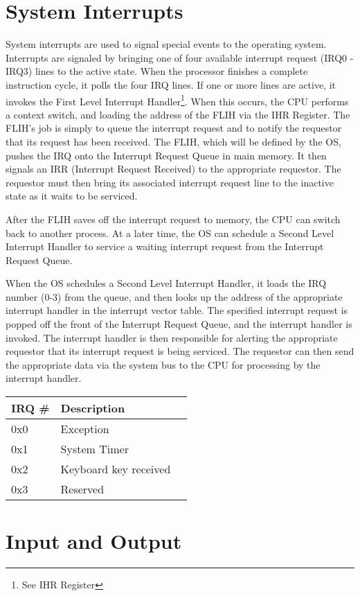 \documentclass{book}
\begin{document}
\section{System Interrupts}
System interrupts are used to signal special events to the operating system. Interrupts are signaled by
bringing one of four available interrupt request (IRQ0 - IRQ3) lines to the active state. When the processor
finishes a complete instruction cycle, it polls the four IRQ lines. If one or more lines are active, it invokes
the First Level Interrupt Handler\footnote{See IHR Register}. When this occurs, the CPU performs a context switch,
and loading the address of the FLIH via the IHR Register. The FLIH's job is simply to queue the interrupt request
and to notify the requestor that its request has been received. The FLIH, which will be defined by the OS,
pushes the IRQ onto the Interrupt Request Queue in main memory. It then signals an IRR (Interrupt Request
Received) to the appropriate requestor. The requestor must then bring its associated interrupt request line to
the inactive state as it waits to be serviced.

After the FLIH saves off the interrupt request to memory, the CPU can switch back to another process. At a later
time, the OS can schedule a Second Level Interrupt Handler to service a waiting interrupt request from the
Interrupt Request Queue.

When the OS schedules a Second Level Interrupt Handler, it loads the IRQ number (0-3) from the queue, and then
looks up the address of the appropriate interrupt handler in the interrupt vector table. The specified
interrupt request is popped off the front of the Interrupt Request Queue, and the interrupt handler is invoked.
The interrupt handler is then responsible for alerting the appropriate requestor that its interrupt request is
being serviced. The requestor can then send the appropriate data via the system bus to the CPU for processing
by the interrupt handler.

\begin{tabular}{|l|l|l|}
  \hline
  \textbf{IRQ \#} & \textbf{Description} \\
  \hline
  0x0 & Exception \\
  0x1 & System Timer \\
  0x2 & Keyboard key received \\
  0x3 & Reserved \\
  \hline
\end{tabular}

\section{Input and Output}
\end{document}
